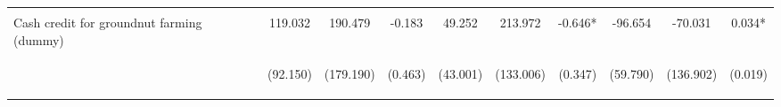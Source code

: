 \begin{center}
\begin{tabular}{lccccccccc}
\vspace{4pt} & \begin{footnotesize}[0.691]\end{footnotesize} & \begin{footnotesize}[0.115]\end{footnotesize} & \begin{footnotesize}[0.433]\end{footnotesize} & \begin{footnotesize}[0.149]\end{footnotesize} & \begin{footnotesize}[0.165]\end{footnotesize} & \begin{footnotesize}[0.395]\end{footnotesize} & \begin{footnotesize}[0.938]\end{footnotesize} & \begin{footnotesize}[0.150]\end{footnotesize} & \begin{footnotesize}[0.519]\end{footnotesize} \\
Cash credit for groundnut farming (dummy) & 119.032 & 190.479 & -0.183 & 49.252 & 213.972 & -0.646* & -96.654 & -70.031 & 0.034* \\
 & \begin{footnotesize}(92.150)\end{footnotesize} & \begin{footnotesize}(179.190)\end{footnotesize} & \begin{footnotesize}(0.463)\end{footnotesize} & \begin{footnotesize}(43.001)\end{footnotesize} & \begin{footnotesize}(133.006)\end{footnotesize} & \begin{footnotesize}(0.347)\end{footnotesize} & \begin{footnotesize}(59.790)\end{footnotesize} & \begin{footnotesize}(136.902)\end{footnotesize} & \begin{footnotesize}(0.019)\end{footnotesize} \\

\end{tabular}
\end{center}
